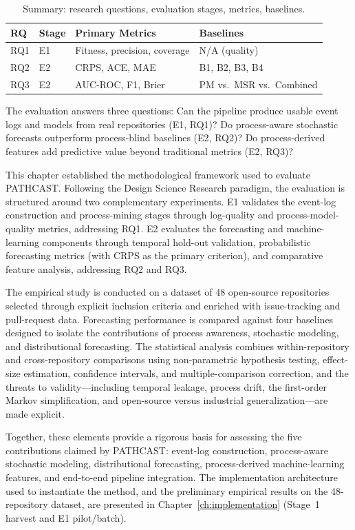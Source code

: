 \begin{table}[htbp]
\centering
\caption{Summary: research questions, evaluation stages, metrics, baselines.}
\label{tab:methodology-summary}
\small
\begin{tabular}{llll}
\toprule
\textbf{RQ} & \textbf{Stage} & \textbf{Primary Metrics} & \textbf{Baselines} \\
\midrule
RQ1 & E1 & Fitness, precision, coverage    & N/A (quality) \\
RQ2 & E2 & CRPS, ACE, MAE                  & B1, B2, B3, B4 \\
RQ3 & E2 & AUC-ROC, F1, Brier              & PM vs.\ MSR vs.\ Combined \\
\bottomrule
\end{tabular}
\end{table}

The evaluation answers three questions: Can the pipeline produce usable
event logs and models from real repositories (E1, RQ1)? Do process-aware
stochastic forecasts outperform process-blind baselines (E2, RQ2)? Do
process-derived features add predictive value beyond traditional metrics
(E2, RQ3)?

This chapter established the methodological framework used to evaluate
PATHCAST. Following the Design Science Research paradigm, the evaluation is
structured around two complementary experiments. E1 validates the event-log
construction and process-mining stages through log-quality and
process-model-quality metrics, addressing RQ1. E2 evaluates the forecasting
and machine-learning components through temporal hold-out validation,
probabilistic forecasting metrics (with CRPS as the primary criterion), and
comparative feature analysis, addressing RQ2 and RQ3.

The empirical study is conducted on a dataset of 48 open-source repositories
selected through explicit inclusion criteria and enriched with
issue-tracking and pull-request data. Forecasting performance is compared
against four baselines designed to isolate the contributions of process
awareness, stochastic modeling, and distributional forecasting. The
statistical analysis combines within-repository and cross-repository
comparisons using non-parametric hypothesis testing, effect-size estimation,
confidence intervals, and multiple-comparison correction, and the threats to
validity---including temporal leakage, process drift, the first-order Markov
simplification, and open-source versus industrial generalization---are made
explicit.

Together, these elements provide a rigorous basis for assessing the five
contributions claimed by PATHCAST: event-log construction, process-aware
stochastic modeling, distributional forecasting, process-derived
machine-learning features, and end-to-end pipeline integration. The
implementation architecture used to instantiate the method, and the
preliminary empirical results on the 48-repository dataset, are presented in
Chapter~\ref{ch:implementation} (Stage~1 harvest and E1 pilot/batch).
